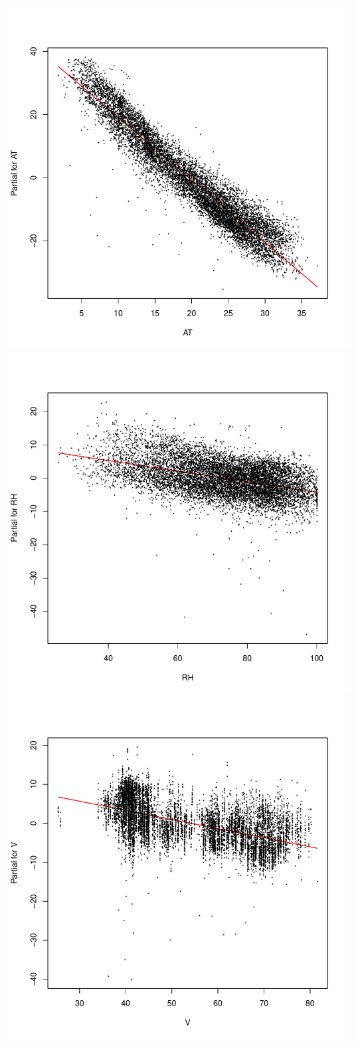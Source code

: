 \documentclass[11pt]{article}
\theoremstyle{definition}
\begin{document}
\begin{itemize}
\begin{itemize}
\begin{itemize}
                        \includegraphics[width=9cm]{final/2aiii_pr_AT} \\ 
                        \includegraphics[width=9cm]{final/2aiii_pr_RH} 
                        \includegraphics[width=9cm]{final/2aiii_pr_V} \\ 

\end{itemize}
\end{itemize}
\end{itemize}
\end{document}
